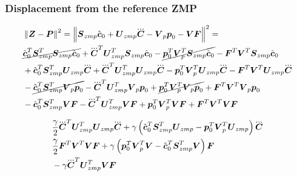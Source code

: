 \subsubsection{Displacement from the reference ZMP}
\begin{equation*}
\begin{split}
    &\norm{\ZMP - \FP}^2 = 
    \norm{\M{S}_{zmp} \cstate_0 + \M{U}_{zmp} \cJerk  -  \M{V}_p \fp_0 - \M{V} \FD} ^ 2 = \\
%
%
    &
    \cancel{\cstate_0^T \M{S}_{zmp}^T \M{S}_{zmp} \cstate_0} 
    + \cJerk^T \M{U}_{zmp}^T \M{S}_{zmp} \cstate_0
    - \cancel{\fp_0^T \M{V}_p^T \M{S}_{zmp} \cstate_0}
    - \FD^T \M{V}^T \M{S}_{zmp} \cstate_0 \\
    &
    + \cstate_0^T \M{S}_{zmp}^T \M{U}_{zmp} \cJerk 
    + \cJerk^T \M{U}_{zmp}^T \M{U}_{zmp} \cJerk
    - \fp_0^T \M{V}_p^T \M{U}_{zmp} \cJerk
    - \FD^T \M{V}^T \M{U}_{zmp} \cJerk\\
    &
    - \cancel{\cstate_0^T \M{S}_{zmp}^T \M{V}_p \fp_0}
    - \cJerk^T \M{U}_{zmp}^T \M{V}_p \fp_0
    + \cancel{\fp_0^T \M{V}_p^T \M{V}_p \fp_0}
    + \FD^T \M{V}^T \M{V}_p \fp_0\\
    &
    - \cstate_0^T \M{S}_{zmp}^T \M{V} \FD
    - \cJerk^T \M{U}_{zmp}^T \M{V} \FD
    + \fp_0^T \M{V}_p^T \M{V} \FD
    + \FD^T \M{V}^T \M{V} \FD\\
\end{split}
\end{equation*}

\begin{equation*}
\begin{split}
    &
    \frac{\gamma}{2} \cJerk^T \M{U}_{zmp}^T \M{U}_{zmp} \cJerk
    + 
    \gamma 
    \left(
        \cstate_0^T \M{S}_{zmp}^T \M{U}_{zmp}
        - 
        \fp_0^T \M{V}_p^T \M{U}_{zmp} 
    \right)
    \cJerk\\
    &
    \frac{\gamma}{2} \FD^T \M{V}^T \M{V} \FD
    + 
    \gamma 
    \left(
        \fp_0^T \M{V}_p^T \M{V}
        - 
        \cstate_0^T \M{S}_{zmp}^T \M{V}
    \right)
    \FD\\
    &
    - \gamma \cJerk^T \M{U}_{zmp}^T \M{V} \FD
\end{split}
\end{equation*}

